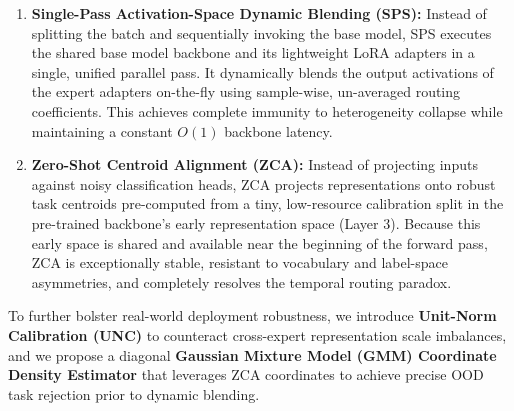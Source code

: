 \begin{enumerate}
    \item \textbf{Single-Pass Activation-Space Dynamic Blending (SPS):} Instead of splitting the batch and sequentially invoking the base model, SPS executes the shared base model backbone and its lightweight LoRA adapters in a single, unified parallel pass. It dynamically blends the output activations of the expert adapters on-the-fly using sample-wise, un-averaged routing coefficients. This achieves complete immunity to heterogeneity collapse while maintaining a constant $O(1)$ backbone latency.
    \item \textbf{Zero-Shot Centroid Alignment (ZCA):} Instead of projecting inputs against noisy classification heads, ZCA projects representations onto robust task centroids pre-computed from a tiny, low-resource calibration split in the pre-trained backbone's early representation space (Layer 3). Because this early space is shared and available near the beginning of the forward pass, ZCA is exceptionally stable, resistant to vocabulary and label-space asymmetries, and completely resolves the temporal routing paradox.
\end{enumerate}

To further bolster real-world deployment robustness, we introduce \textbf{Unit-Norm Calibration (UNC)} to counteract cross-expert representation scale imbalances, and we propose a diagonal \textbf{Gaussian Mixture Model (GMM) Coordinate Density Estimator} that leverages ZCA coordinates to achieve precise OOD task rejection prior to dynamic blending.

